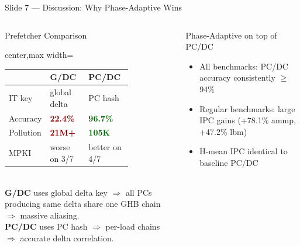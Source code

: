 \documentclass[aspectratio=169,t]{beamer}
\newcommand{\good}[1]{\textcolor{darkgreen}{\textbf{#1}}}
\newcommand{\bad}[1]{\textcolor{darkred}{\textbf{#1}}}
\begin{document}
\begin{frame}{Slide 7 --- Discussion: Why Phase-Adaptive Wins}
\begin{columns}[T,totalwidth=\textwidth]
\begin{block}{Prefetcher Comparison}
\tiny
\centering
\begin{adjustbox}{center,max width=\linewidth}
\begin{tabular}{@{}l p{0.35\linewidth} p{0.38\linewidth}@{}}
\toprule
 & \textbf{G/DC} & \textbf{PC/DC}\\
\midrule
IT key & global delta & PC hash\\
Accuracy & \bad{22.4\%} & \good{96.7\%}\\
Pollution & \bad{21M+} & \good{105K}\\
MPKI & worse on 3/7 & better on 4/7\\
\bottomrule
\end{tabular}
\end{adjustbox}\\[3pt]
\textbf{G/DC} uses global delta key $\Rightarrow$ all PCs producing same delta share one GHB chain $\Rightarrow$ massive aliasing.\\[3pt]
\textbf{PC/DC} uses PC hash $\Rightarrow$ per-load chains $\Rightarrow$ accurate delta correlation.
\end{block}
\begin{alertblock}{Phase-Adaptive on top of PC/DC}
\small
\begin{itemize}\setlength\itemsep{1pt}
  \item All benchmarks: PC/DC accuracy consistently $\ge$94\%
  \item Regular benchmarks: large IPC gains (+78.1\% ammp, +47.2\% lbm)
  \item H-mean IPC identical to baseline PC/DC
\end{itemize}
\end{alertblock}
\end{columns}
\end{frame}

\end{document}
